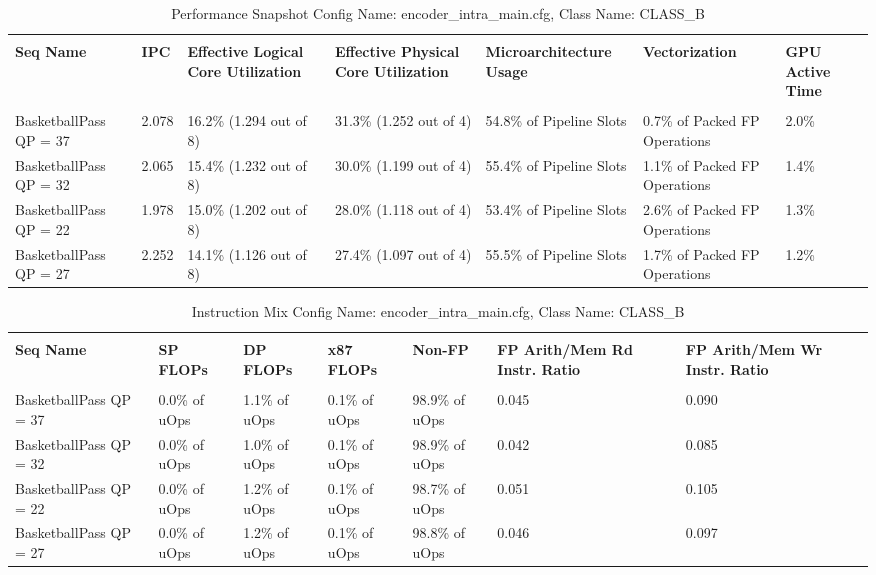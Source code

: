 \documentclass{article}%
\begin{document}
\begin{longtabu}{| X[l] | X[l] | X[l] | X[l] | X[l] | X[l] | X[l] |}%
\caption{%
Performance Snapshot\newline%
 Config Name: encoder\_intra\_main.cfg,\newline%
 Class Name: CLASS\_B\newline%
%
}%
\hline%
&&&&&&\\%
\textbf{Seq Name}&\textbf{IPC}&\textbf{Effective Logical Core Utilization}&\textbf{Effective Physical Core Utilization}&\textbf{Microarchitecture Usage}&\textbf{Vectorization}&\textbf{GPU Active Time}\\%
&&&&&&\\%
\hline%
\endhead%
BasketballPass\newline%
 QP = 37&2.078&16.2\% (1.294 out of 8)&31.3\% (1.252 out of 4)&54.8\% of Pipeline Slots&0.7\% of Packed FP Operations&2.0\%\\%
\hline%
BasketballPass\newline%
 QP = 32&2.065&15.4\% (1.232 out of 8)&30.0\% (1.199 out of 4)&55.4\% of Pipeline Slots&1.1\% of Packed FP Operations&1.4\%\\%
\hline%
BasketballPass\newline%
 QP = 22&1.978&15.0\% (1.202 out of 8)&28.0\% (1.118 out of 4)&53.4\% of Pipeline Slots&2.6\% of Packed FP Operations&1.3\%\\%
\hline%
BasketballPass\newline%
 QP = 27&2.252&14.1\% (1.126 out of 8)&27.4\% (1.097 out of 4)&55.5\% of Pipeline Slots&1.7\% of Packed FP Operations&1.2\%\\%
\hline%
\end{longtabu}%
\begin{longtabu}{| X[l] | X[l] | X[l] | X[l] | X[l] | X[l] | X[l] |}%
\caption{%
Instruction Mix\newline%
 Config Name: encoder\_intra\_main.cfg,\newline%
 Class Name: CLASS\_B\newline%
%
}%
\hline%
&&&&&&\\%
\textbf{Seq Name}&\textbf{SP FLOPs}&\textbf{DP FLOPs}&\textbf{x87 FLOPs}&\textbf{Non{-}FP}&\textbf{FP Arith/Mem Rd Instr. Ratio}&\textbf{FP Arith/Mem Wr Instr. Ratio}\\%
&&&&&&\\%
\hline%
\endhead%
BasketballPass\newline%
 QP = 37&0.0\% of uOps&1.1\% of uOps&0.1\% of uOps&98.9\% of uOps&0.045&0.090\\%
\hline%
BasketballPass\newline%
 QP = 32&0.0\% of uOps&1.0\% of uOps&0.1\% of uOps&98.9\% of uOps&0.042&0.085\\%
\hline%
BasketballPass\newline%
 QP = 22&0.0\% of uOps&1.2\% of uOps&0.1\% of uOps&98.7\% of uOps&0.051&0.105\\%
\hline%
BasketballPass\newline%
 QP = 27&0.0\% of uOps&1.2\% of uOps&0.1\% of uOps&98.8\% of uOps&0.046&0.097\\%
\hline%
\end{longtabu}%
\end{document}
